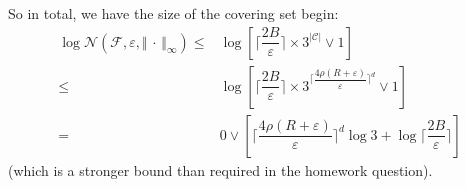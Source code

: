 \documentclass[11pt,a4paper]{ctexart}
\numberwithin{equation}{section}%
\begin{document}
So in total, we have the size of the covering set begin:
\begin{align*}
    \log \mathcal{N}(\mathcal{F},\varepsilon , \left\Vert \, \cdot \,  \right\Vert _\infty ) \leq & \log \left[ \lceil \dfrac{ 2B }{ \varepsilon  }\rceil \times 3^{\left\vert \mathcal{C} \right\vert } \vee 1 \right] \\
    \leq & \log \left[ \lceil \dfrac{ 2B }{ \varepsilon  }\rceil \times 3^{\lceil \dfrac{ 4\rho (R+\varepsilon ) }{ \varepsilon  }\rceil ^d } \vee 1\right]\\
    =& 0 \vee \left[ \lceil \dfrac{ 4\rho (R+\varepsilon ) }{ \varepsilon  }\rceil ^d  \log 3 + \log \lceil \dfrac{ 2B }{ \varepsilon  }\rceil \right]
\end{align*}
(which is a stronger bound than required in the homework question).



    

    

    
\end{document}
